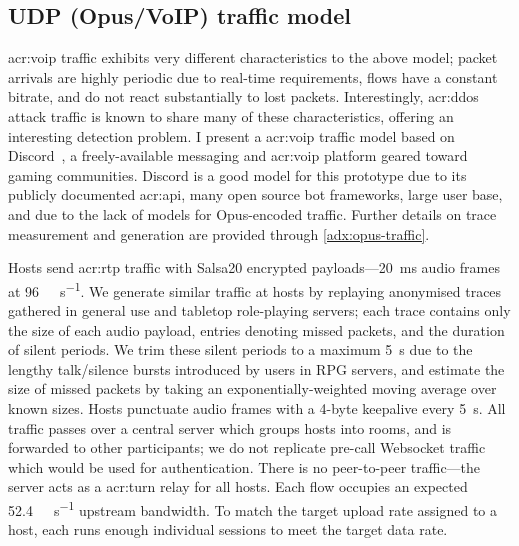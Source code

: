 \subsection{UDP (Opus/VoIP) traffic model}\label{sec:udp-opus-traffic-model}
\gls{acr:voip} traffic exhibits very different characteristics to the above model; packet arrivals are highly periodic due to real-time requirements, flows have a constant bitrate, and do not react substantially to lost packets.
Interestingly, \gls{acr:ddos} attack traffic is known to share many of these characteristics, offering an interesting detection problem.
I present a \gls{acr:voip} traffic model based on Discord~\parencite{discord}, a freely-available messaging and \gls{acr:voip} platform geared toward gaming communities.
Discord is a good model for this prototype due to its publicly documented \gls{acr:api}, many open source bot frameworks, large user base, and due to the lack of models for Opus-encoded traffic.
Further details on trace measurement and generation are provided through \cref{adx:opus-traffic}.

Hosts send \gls{acr:rtp} traffic with Salsa20 encrypted payloads---\qty{20}{\milli\second} audio frames at \qty{96}{\kilo\bit\per\second}.
We generate similar traffic at hosts by replaying anonymised traces gathered in general use and tabletop role-playing servers; each trace contains only the size of each audio payload, entries denoting missed packets, and the duration of silent periods.
We trim these silent periods to a maximum \qty{5}{\second} due to the lengthy talk/silence bursts introduced by users in RPG servers, and estimate the size of missed packets by taking an exponentially-weighted moving average over known sizes.
Hosts punctuate audio frames with a 4-byte keepalive every \qty{5}{\second}.
All traffic passes over a central server which groups hosts into rooms, and is forwarded to other participants; we do not replicate pre-call Websocket traffic which would be used for authentication.
There is no peer-to-peer traffic---the server acts as a \gls{acr:turn} relay for all hosts.
Each flow occupies an expected \qty{52.4}{\kilo\bit\per\second} upstream bandwidth.
To match the target upload rate assigned to a host, each runs enough individual sessions to meet the target data rate.

